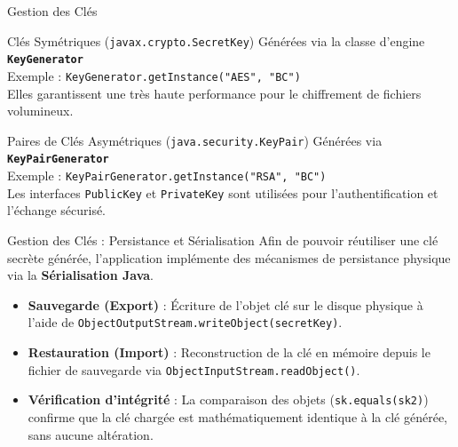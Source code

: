 \documentclass[aspectratio=169,xcolor=dvipsnames]{beamer}
\begin{document}
\begin{frame}{Gestion des Clés}
	\begin{alertblock}{Clés Symétriques (\texttt{javax.crypto.SecretKey})}
		Générées via la classe d'engine \textbf{\texttt{KeyGenerator}} \\
        Exemple : \texttt{KeyGenerator.getInstance("AES", "BC")} \\
		Elles garantissent une très haute performance pour le chiffrement de fichiers volumineux.
	\end{alertblock}
	
	\begin{examples}{Paires de Clés Asymétriques (\texttt{java.security.KeyPair})}
		Générées via \textbf{\texttt{KeyPairGenerator}} \\
        Exemple : \texttt{KeyPairGenerator.getInstance("RSA", "BC")} \\
		Les interfaces \texttt{PublicKey} et \texttt{PrivateKey} sont utilisées pour l'authentification et l'échange sécurisé.
	\end{examples}
\end{frame}

\begin{frame}{Gestion des Clés : Persistance et Sérialisation}
	Afin de pouvoir réutiliser une clé secrète générée, l'application implémente des mécanismes de persistance physique via la \textbf{Sérialisation Java}.
	\vspace{0.02\textheight}
	\begin{itemize}
		\item \textbf{Sauvegarde (Export)} : Écriture de l'objet clé sur le disque physique à l'aide de \texttt{ObjectOutputStream.writeObject(secretKey)}.
		\item \textbf{Restauration (Import)} : Reconstruction de la clé en mémoire depuis le fichier de sauvegarde via \texttt{ObjectInputStream.readObject()}.
		\item \textbf{Vérification d'intégrité} : La comparaison des objets (\texttt{sk.equals(sk2)}) confirme que la clé chargée est mathématiquement identique à la clé générée, sans aucune altération.
	\end{itemize}
\end{frame}
\end{document}
